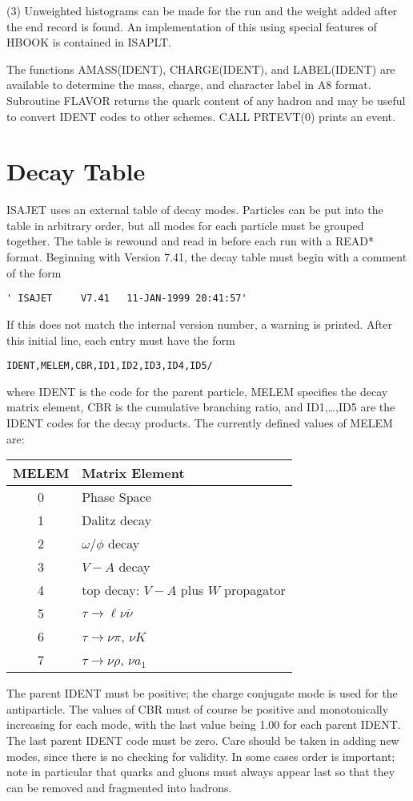       (3) Unweighted histograms can be made for the run and the weight
added after the end record is found. An implementation of this using
special features of HBOOK is contained in ISAPLT.

      The functions AMASS(IDENT), CHARGE(IDENT), and LABEL(IDENT) are
available to determine the mass, charge, and character label in A8
format. Subroutine FLAVOR returns the quark content of any hadron and
may be useful to convert IDENT codes to other schemes. CALL PRTEVT(0)
prints an event.
\newpage
\section{Decay Table\label{DECAY}}

      ISAJET uses an external table of decay modes. Particles can be
put into the table in arbitrary order, but all modes for each particle
must be grouped together. The table is rewound and read in before each
run with a READ* format. Beginning with Version 7.41, the decay table
must begin with a comment of the form
\begin{verbatim}
' ISAJET     V7.41   11-JAN-1999 20:41:57'
\end{verbatim}
If this does not match the internal version number, a warning is
printed. After this initial line, each entry must have the form
\begin{verbatim}
IDENT,MELEM,CBR,ID1,ID2,ID3,ID4,ID5/
\end{verbatim}
where IDENT is the code for the parent particle, MELEM specifies the
decay matrix element, CBR is the cumulative branching ratio, and
ID1,\dots,ID5 are the IDENT codes for the decay products. The
currently defined values of MELEM are:
\begin{center}
\begin{tabular}{cl}
\hline
MELEM   &\quad Matrix Element \\
\hline
0       &\quad Phase Space \\
1       &\quad Dalitz decay \\
2       &\quad $\omega/\phi$ decay \\
3       &\quad $V-A$ decay \\
4       &\quad top decay: $V-A$ plus $W$ propagator \\
5       &\quad $\tau \to \ell \nu \bar \nu$ \\
6       &\quad $\tau \to \nu \pi$, $\nu K$ \\
7       &\quad $\tau \to \nu \rho$, $\nu a_1$ \\
\hline
\end{tabular}
\end{center}
The parent IDENT must be positive; the charge conjugate mode is used
for the antiparticle. The values of CBR must of course be positive and
monotonically increasing for each mode, with the last value being 1.00
for each parent IDENT. The last parent IDENT code must be zero. Care
should be taken in adding new modes, since there is no checking for
validity. In some cases order is important; note in particular that
quarks and gluons must always appear last so that they can be removed
and fragmented into hadrons.

